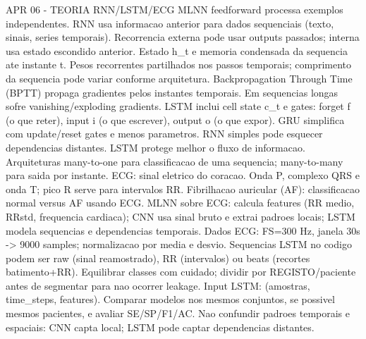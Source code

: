 APR 06 - TEORIA RNN/LSTM/ECG
MLNN feedforward processa exemplos independentes. RNN usa informacao anterior para dados sequenciais (texto, sinais, series temporais).
Recorrencia externa pode usar outputs passados; interna usa estado escondido anterior.
Estado h_t e memoria condensada da sequencia ate instante t.
Pesos recorrentes partilhados nos passos temporais; comprimento da sequencia pode variar conforme arquitetura.
Backpropagation Through Time (BPTT) propaga gradientes pelos instantes temporais. Em sequencias longas sofre vanishing/exploding gradients.
LSTM inclui cell state c_t e gates: forget f (o que reter), input i (o que escrever), output o (o que expor).
GRU simplifica com update/reset gates e menos parametros.
RNN simples pode esquecer dependencias distantes. LSTM protege melhor o fluxo de informacao.
Arquiteturas many-to-one para classificacao de uma sequencia; many-to-many para saida por instante.
ECG: sinal eletrico do coracao. Onda P, complexo QRS e onda T; pico R serve para intervalos RR.
Fibrilhacao auricular (AF): classificacao normal versus AF usando ECG.
MLNN sobre ECG: calcula features (RR medio, RRstd, frequencia cardiaca); CNN usa sinal bruto e extrai padroes locais; LSTM modela sequencias e dependencias temporais.
Dados ECG: FS=300 Hz, janela 30s -> 9000 samples; normalizacao por media e desvio.
Sequencias LSTM no codigo podem ser raw (sinal reamostrado), RR (intervalos) ou beats (recortes batimento+RR).
Equilibrar classes com cuidado; dividir por REGISTO/paciente antes de segmentar para nao ocorrer leakage.
Input LSTM: (amostras, time_steps, features).
Comparar modelos nos mesmos conjuntos, se possivel mesmos pacientes, e avaliar SE/SP/F1/AC.
Nao confundir padroes temporais e espaciais: CNN capta local; LSTM pode captar dependencias distantes.